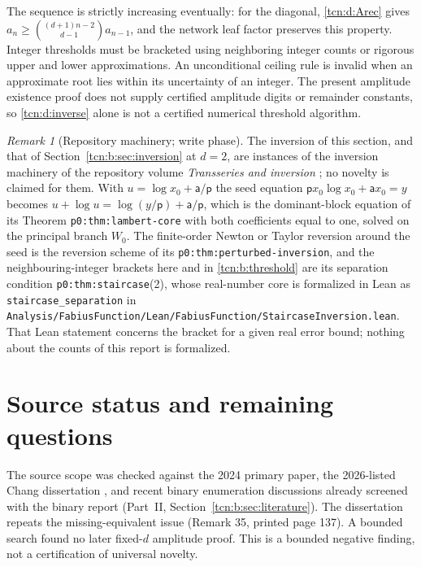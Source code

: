 \documentclass[11pt,letterpaper]{article}
\theoremstyle{remark}
\newtheorem{remark}[theorem]{Remark}
\begin{document}
The sequence is strictly increasing eventually: for the diagonal, \eqref{tcn:d:Arec} gives
$a_n\ge\binom{(d+1)n-2}{d-1}a_{n-1}$, and the network leaf factor preserves this property. Integer thresholds must be bracketed using neighboring integer counts or rigorous upper and lower approximations. An unconditional ceiling rule is invalid when an approximate root lies within its uncertainty of an integer. The present amplitude existence proof does not supply certified amplitude digits or remainder constants, so \eqref{tcn:d:inverse} alone is not a certified numerical threshold algorithm.

\begin{remark}[Repository machinery; write phase]\label{tcn:d:rem:tai}
The inversion of this section, and that of Section~\ref{tcn:b:sec:inversion} at $d=2$, are instances of the inversion machinery of the repository volume \emph{Transseries and inversion} \cite{TAI}; no novelty is claimed for them. With $u=\log x_0+\mathsf a/\mathsf p$ the seed equation $\mathsf px_0\log x_0+\mathsf ax_0=y$ becomes $u+\log u=\log(y/\mathsf p)+\mathsf a/\mathsf p$, which is the dominant-block equation of its Theorem \textup{\nolinkurl{p0:thm:lambert-core}} with both coefficients equal to one, solved on the principal branch $W_0$. The finite-order Newton or Taylor reversion around the seed is the reversion scheme of its \textup{\nolinkurl{p0:thm:perturbed-inversion}}, and the neighbouring-integer brackets here and in \eqref{tcn:b:threshold} are its separation condition \texttt{p0:thm:staircase}(2), whose real-number core is formalized in Lean as \texttt{staircase\_separation} in \textup{\nolinkurl{Analysis/FabiusFunction/Lean/FabiusFunction/StaircaseInversion.lean}}. That Lean statement concerns the bracket for a given real error bound; nothing about the counts of this report is formalized.
\end{remark}

\section{Source status and remaining questions}\label{tcn:d:sec:status}
The source scope was checked against the 2024 primary paper, the 2026-listed Chang dissertation \cite{ChangThesis}, and recent binary enumeration discussions already screened with the binary report (Part~II, Section~\ref{tcn:b:sec:literature}). The dissertation repeats the missing-equivalent issue (Remark 35, printed page 137). A bounded search found no later fixed-$d$ amplitude proof. This is a bounded negative finding, not a certification of universal novelty.
\end{document}
